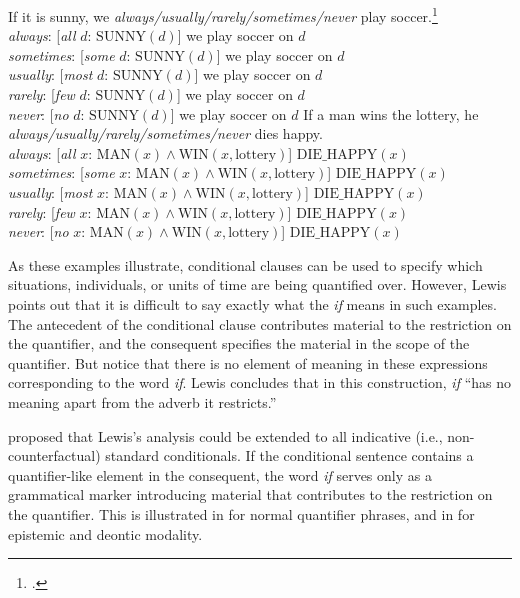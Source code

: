 \ea \label{ex:19.27}
If it is sunny, we \textit{always/usually/rarely/sometimes/never} play soccer.\footnote{\citet{Lewis1975}.}\\
\textit{always}:  [\textit{all} $d$: $\text{SUNNY}(d)$] we play soccer on $d$\\
\textit{sometimes}: [\textit{some} $d$: $\text{SUNNY}(d)$] we play soccer on $d$\\
\textit{usually}: [\textit{most} $d$: $\text{SUNNY}(d)$] we play soccer on $d$\\
\textit{rarely}: [\textit{few} $d$: $\text{SUNNY}(d)$] we play soccer on $d$\\
\textit{never}: [\textit{no} $d$: $\text{SUNNY}(d)$] we play soccer on $d$
\ex \label{ex:19.28}
If a man wins the lottery, he \textit{always/usually/rarely/sometimes/never} dies happy.\\
\textit{always}:  [\textit{all} $x$: $\text{MAN}(x) \wedge \text{WIN}(x,\text{lottery})$] $\text{DIE\_HAPPY}(x)$\\
\textit{sometimes}:  [\textit{some} $x$: $\text{MAN}(x) \wedge \text{WIN}(x,\text{lottery})$] $\text{DIE\_HAPPY}(x)$\\
\textit{usually}:  [\textit{most} $x$: $\text{MAN}(x) \wedge \text{WIN}(x,\text{lottery})$]   $\text{DIE\_HAPPY}(x)$\\
\textit{rarely}:  [\textit{few} $x$: $\text{MAN}(x) \wedge \text{WIN}(x,\text{lottery})$]     $\text{DIE\_HAPPY}(x)$\\
\textit{never}:  [\textit{no} $x$: $\text{MAN}(x) \wedge \text{WIN}(x,\text{lottery})$]       $\text{DIE\_HAPPY}(x)$
\z


As these examples illustrate, conditional clauses can be used to specify which situations, individuals, or units of time are being quantified over. However, Lewis points out that it is difficult to say exactly what the \textit{if} means in such examples. The antecedent of the conditional clause contributes material to the restriction on the quantifier, and the consequent specifies the material in the scope of the quantifier. But notice that there is no element of meaning in these expressions corresponding to the word \textit{if}. Lewis concludes that in this construction, \textit{if} “has no meaning apart from the adverb it restricts.”


\citet{Kratzer1986} proposed that Lewis’s analysis could be extended to all indicative (i.e., non-counterfactual) standard conditionals. If the conditional sentence contains a quantifier-like element in the consequent, the word \textit{if} serves only as a grammatical marker introducing material that contributes to the restriction on the quantifier. This is illustrated in  for normal quantifier phrases, and in  for epistemic and deontic modality.


